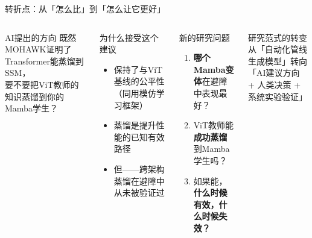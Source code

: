 \documentclass[aspectratio=169,10pt]{beamer}
\newcommand{\HL}[1]{\textcolor{emphasis}{#1}}
\begin{document}
  \begin{frame}{转折点：从「怎么比」到「怎么让它更好」}
  \begin{columns}[T]
  \begin{block}{AI提出的方向}
  \footnotesize
  既然MOHAWK证明了Transformer能蒸馏到SSM，\\
  要不要把ViT教师的知识蒸馏到你的Mamba学生？
\end{block}
\vspace{0.3cm}
\begin{block}{为什么接受这个建议}
\begin{itemize}\footnotesize
\item 保持了与ViT基线的公平性（同用模仿学习框架）
\item 蒸馏是提升性能的已知有效路径
\item 但——\HL{跨架构蒸馏在避障中从未被验证过}
\end{itemize}
\end{block}

\begin{block}{新的研究问题}
\footnotesize
\begin{enumerate}
\item \textbf{哪个Mamba变体}在避障中表现最好？
\item ViT教师能\textbf{成功蒸馏}到Mamba学生吗？
\item 如果能，\textbf{什么时候有效，什么时候失效？}
\end{enumerate}
\end{block}
\vspace{0.3cm}
\begin{alertblock}{研究范式的转变}
\footnotesize
从「自动化管线生成模型」转向\\
「AI建议方向 + 人类决策 + 系统实验验证」
\end{alertblock}
\end{columns}
\end{frame}
\end{document}
